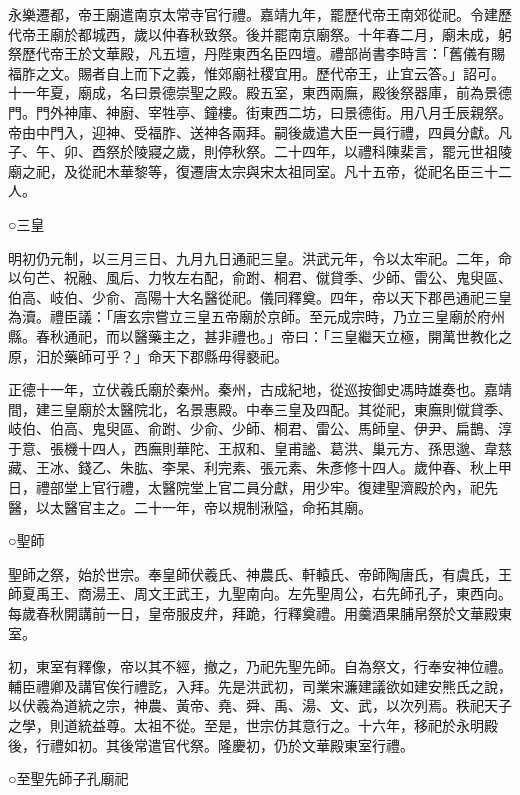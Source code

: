 永樂遷都，帝王廟遣南京太常寺官行禮。嘉靖九年，罷歷代帝王南郊從祀。令建歷代帝王廟於都城西，歲以仲春秋致祭。後并罷南京廟祭。十年春二月，廟未成，躬祭歷代帝王於文華殿，凡五壇，丹陛東西名臣四壇。禮部尚書李時言：「舊儀有賜福胙之文。賜者自上而下之義，惟郊廟社稷宜用。歷代帝王，止宜云答。」詔可。十一年夏，廟成，名曰景德崇聖之殿。殿五室，東西兩廡，殿後祭器庫，前為景德門。門外神庫、神廚、宰牲亭、鐘樓。街東西二坊，曰景德街。用八月壬辰親祭。帝由中門入，迎神、受福胙、送神各兩拜。嗣後歲遣大臣一員行禮，四員分獻。凡子、午、卯、酉祭於陵寢之歲，則停秋祭。二十四年，以禮科陳棐言，罷元世祖陵廟之祀，及從祀木華黎等，復遷唐太宗與宋太祖同室。凡十五帝，從祀名臣三十二人。

○三皇

明初仍元制，以三月三日、九月九日通祀三皇。洪武元年，令以太牢祀。二年，命以句芒、祝融、風后、力牧左右配，俞跗、桐君、僦貸季、少師、雷公、鬼臾區、伯高、岐伯、少俞、高陽十大名醫從祀。儀同釋奠。四年，帝以天下郡邑通祀三皇為瀆。禮臣議：「唐玄宗嘗立三皇五帝廟於京師。至元成宗時，乃立三皇廟於府州縣。春秋通祀，而以醫藥主之，甚非禮也。」帝曰：「三皇繼天立極，開萬世教化之原，汨於藥師可乎？」命天下郡縣毋得褻祀。

正德十一年，立伏羲氏廟於秦州。秦州，古成紀地，從巡按御史馮時雄奏也。嘉靖間，建三皇廟於太醫院北，名景惠殿。中奉三皇及四配。其從祀，東廡則僦貸季、岐伯、伯高、鬼臾區、俞跗、少俞、少師、桐君、雷公、馬師皇、伊尹、扁鵲、淳于意、張機十四人，西廡則華陀、王叔和、皇甫謐、葛洪、巢元方、孫思邈、韋慈藏、王冰、錢乙、朱肱、李杲、利完素、張元素、朱彥修十四人。歲仲春、秋上甲日，禮部堂上官行禮，太醫院堂上官二員分獻，用少牢。復建聖濟殿於內，祀先醫，以太醫官主之。二十一年，帝以規制湫隘，命拓其廟。

○聖師

聖師之祭，始於世宗。奉皇師伏羲氏、神農氏、軒轅氏、帝師陶唐氏，有虞氏，王師夏禹王、商湯王、周文王武王，九聖南向。左先聖周公，右先師孔子，東西向。每歲春秋開講前一日，皇帝服皮弁，拜跪，行釋奠禮。用羹酒果脯帛祭於文華殿東室。

初，東室有釋像，帝以其不經，撤之，乃祀先聖先師。自為祭文，行奉安神位禮。輔臣禮卿及講官俟行禮訖，入拜。先是洪武初，司業宋濂建議欲如建安熊氏之說，以伏羲為道統之宗，神農、黃帝、堯、舜、禹、湯、文、武，以次列焉。秩祀天子之學，則道統益尊。太祖不從。至是，世宗仿其意行之。十六年，移祀於永明殿後，行禮如初。其後常遣官代祭。隆慶初，仍於文華殿東室行禮。

○至聖先師子孔廟祀

